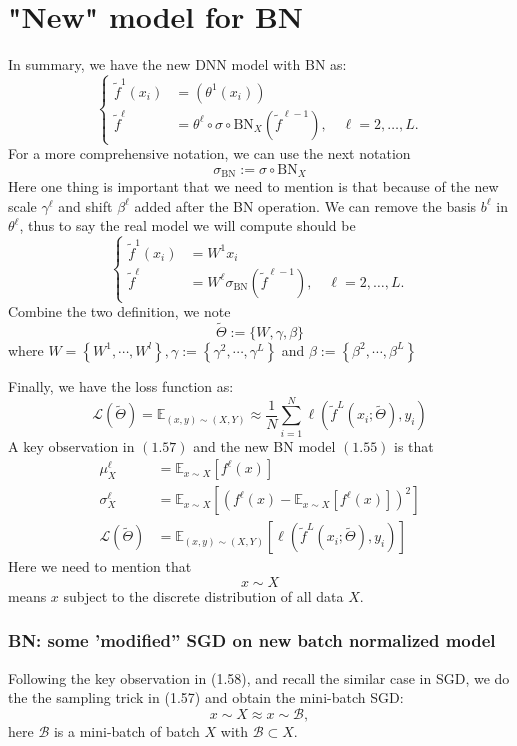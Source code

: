 \documentclass[10pt]{article}
\begin{document}
\section{"New" model for BN}
In summary, we have the new DNN model with BN as:
$$
\begin{cases}\tilde{f}^{1}\left(x_{i}\right) & =\left(\theta^{1}\left(x_{i}\right)\right) \\ \tilde{f}^{\ell} & =\theta^{\ell} \circ \sigma \circ \mathrm{BN}_{X}\left(\tilde{f}^{\ell-1}\right), \quad \ell=2, \ldots, L .\end{cases}
$$
For a more comprehensive notation, we can use the next notation
$$
\sigma_{\mathrm{BN}}:=\sigma \circ \mathrm{BN}_{X}
$$
Here one thing is important that we need to mention is that because of the new scale $\gamma^{\ell}$ and shift $\beta^{\ell}$ added after the BN operation. We can remove the basis $b^{\ell}$ in $\theta^{\ell}$, thus to say the real model we will compute should be
$$
\begin{cases}\tilde{f}^{1}\left(x_{i}\right) & =W^{1} x_{i} \\ \tilde{f}^{\ell} & =W^{\ell} \sigma_{\mathrm{BN}}\left(\tilde{f}^{\ell-1}\right), \quad \ell=2, \ldots, L .\end{cases}
$$
Combine the two definition, we note
$$
\tilde{\Theta}:=\{W, \gamma, \beta\}
$$
where $W=\left\{W^{1}, \cdots, W^{l}\right\}, \gamma:=\left\{\gamma^{2}, \cdots, \gamma^{L}\right\}$ and $\beta:=\left\{\beta^{2}, \cdots, \beta^{L}\right\}$

Finally, we have the loss function as:
$$
\mathcal{L}(\tilde{\Theta})=\mathbb{E}_{(x, y) \sim(X, Y)} \approx \frac{1}{N} \sum_{i=1}^{N} \ell\left(\tilde{f}^{L}\left(x_{i} ; \tilde{\Theta}\right), y_{i}\right)
$$
A key observation in $(1.57)$ and the new BN model $(1.55)$ is that
$$
\begin{aligned}
\mu_{X}^{\ell} &=\mathbb{E}_{x \sim X}\left[f^{\ell}(x)\right] \\
\sigma_{X}^{\ell} &=\mathbb{E}_{x \sim X}\left[\left(f^{\ell}(x)-\mathbb{E}_{x \sim X}\left[f^{\ell}(x)\right]\right)^{2}\right] \\
\mathcal{L}(\tilde{\Theta}) &=\mathbb{E}_{(x, y) \sim(X, Y)}\left[\ell\left(\tilde{f}^{L}\left(x_{i} ; \tilde{\Theta}\right), y_{i}\right)\right]
\end{aligned}
$$
Here we need to mention that
$$
x \sim X
$$
means $x$ subject to the discrete distribution of all data $X$.

\subsubsection{BN: some 'modified'' SGD on new batch normalized model}
Following the key observation in (1.58), and recall the similar case in SGD, we do the the sampling trick in (1.57) and obtain the mini-batch SGD:
$$
x \sim X \approx x \sim \mathcal{B},
$$
here $\mathcal{B}$ is a mini-batch of batch $X$ with $\mathcal{B} \subset X .$
\end{document}
